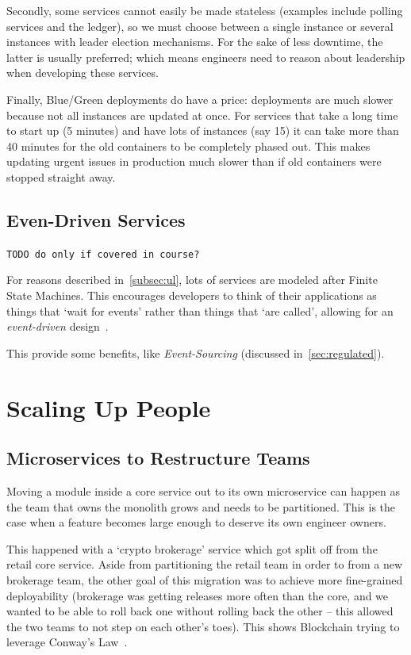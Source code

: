 \documentclass[conference]{IEEEtran}
\begin{document}
    Secondly, some services cannot easily be made stateless (examples include polling services
    and the ledger), so we must choose between a single instance or several instances with leader
    election mechanisms.
    For the sake of less downtime, the latter is usually preferred;
    which means engineers need to reason about leadership when developing these services.

    Finally, Blue/Green deployments do have a price: deployments are much slower because not
    all instances are updated at once.
    For services that take a long time to start up (5 minutes) and have lots of instances (say 15)
    it can take more than 40 minutes for the old containers to be completely phased out.
    This makes updating urgent issues in production much slower than if old containers were stopped
    straight away.

    \subsection{Even-Driven Services}

    \texttt{TODO do only if covered in course?}

    For reasons described in~\ref{subsec:ul}, lots of services are modeled after Finite State
    Machines.
    This encourages developers to think of their applications as things that `wait for events'
    rather than things that `are called', allowing for an \emph{event-driven}
    design~\cite{fowlerEventDriven}.

    This provide some benefits, like \emph{Event-Sourcing} (discussed in~\ref{sec:regulated}).


    \section{Scaling Up People}

    \subsection{Microservices to Restructure Teams}

    Moving a module inside a core service out to its own microservice can happen as the team that
    owns the monolith grows and needs to be partitioned.
    This is the case when a feature becomes large enough to deserve its own engineer owners.

    This happened with a `crypto brokerage' service which got split off from the retail core
    service.
    Aside from partitioning the retail team in order to from a new brokerage team, the other goal of
    this migration was to achieve more fine-grained deployability (brokerage was getting releases
    more often than the core, and we wanted to be able to roll back one without rolling back the
    other -- this allowed the two teams to not step on each other's toes).
    This shows Blockchain trying to leverage Conway's Law~\cite{conwayLaw}.\\
\end{document}
